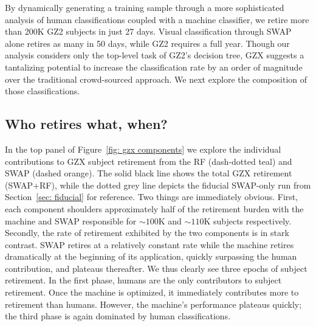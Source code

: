 \documentclass[twocolumn,  trackchanges,]{aastex6}%
\begin{document}
By dynamically generating a training sample through a more sophisticated analysis of 
human classifications coupled with a machine classifier, we retire more than 200K 
GZ2 subjects in just 27 days.  Visual classification through SWAP alone retires as 
many in 50 days, while GZ2 requires a full year.  
Though our analysis considers only the top-level task of GZ2's decision tree, GZX suggests a tantalizing potential to increase the classification rate by an order of magnitude over the traditional crowd-sourced approach.
We next explore the composition of those classifications.



\subsection{Who retires what, when?}  

In the top panel of Figure~\ref{fig: gzx components} we explore the individual 
contributions to GZX subject retirement from the RF (dash-dotted teal) 
and SWAP (dashed orange). The solid black line shows the total GZX retirement (SWAP+RF), while the dotted grey line depicts the fiducial SWAP-only run from 
Section~\ref{sec: fiducial} for reference. 
Two things are immediately obvious. First, each component shoulders approximately
half of the retirement burden with the machine and SWAP responsible for 
$\sim$$100$K and $\sim$$110$K subjects respectively.  
Secondly, the rate of retirement exhibited by the two components is in stark contrast.
SWAP retires at a relatively constant rate while the machine retires 
dramatically at the beginning of its application, quickly surpassing the human 
contribution, and plateaus thereafter. 
We thus clearly see three epochs of subject retirement.
In the first phase, humans are the only contributors to subject retirement.  
Once the machine is optimized, it immediately contributes more to retirement than humans.
However, the machine's performance plateaus quickly;  the third 
phase is again dominated by human classifications.
\end{document}
